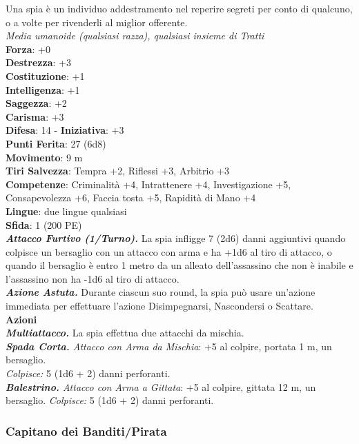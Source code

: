\begin{multicols}{2}
Una spia è un individuo addestramento nel reperire segreti per conto di qualcuno, o a volte per rivenderli al miglior offerente.\\
\emph{Media umanoide (qualsiasi razza), qualsiasi insieme di Tratti}\\
\textbf{Forza}: +0\\
\textbf{Destrezza}: +3\\
\textbf{Costituzione}: +1\\
\textbf{Intelligenza}: +1\\
\textbf{Saggezza}: +2\\
\textbf{Carisma}: +3\\
\textbf{Difesa}: 14 - \textbf{Iniziativa}: +3\\
\textbf{Punti Ferita}: 27 (6d8)\\
\textbf{Movimento}: 9 m\\
\textbf{Tiri Salvezza}: Tempra +2, Riflessi +3, Arbitrio +3 \\
\textbf{Competenze}: Criminalità +4, Intrattenere +4, Investigazione +5, Consapevolezza +6, Faccia tosta +5, Rapidità di Mano +4\\
\textbf{Lingue}: due lingue qualsiasi\\
\textbf{Sfida}: 1 (200 PE)\smallskip\\
\emph{\textbf{Attacco Furtivo (1/Turno).}} La spia infligge 7 (2d6) danni aggiuntivi quando colpisce un bersaglio con un attacco con arma e ha +1d6 al tiro di attacco, o quando il bersaglio è entro 1 metro da un alleato dell'assassino che non è inabile e l'assassino non ha -1d6 al tiro di attacco.\\
\emph{\textbf{Azione Astuta.}} Durante ciascun suo round, la spia può usare un'azione immediata per effettuare l'azione Disimpegnarsi, Nascondersi o Scattare.\\
\smallskip\textbf{Azioni} \\
\emph{\textbf{Multiattacco.}} La spia effettua due attacchi da mischia. \\
\emph{\textbf{Spada Corta.} Attacco con Arma da Mischia}: +5 al colpire, portata 1 m, un bersaglio.\\
\emph{Colpisce:} 5 (1d6 + 2) danni perforanti.\\
\emph{\textbf{Balestrino.} Attacco con Arma a Gittata}: +5 al colpire, gittata 12 m, un bersaglio. \emph{Colpisce:} 5 (1d6 + 2) danni perforanti.\\


\subsubsection{Capitano dei Banditi/Pirata}


\end{multicols}
